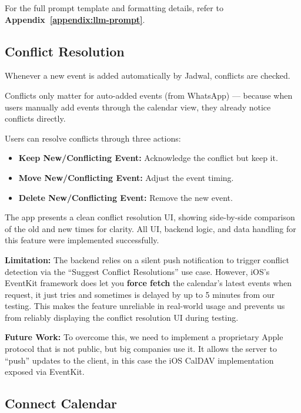For the full prompt template and formatting details, refer to \textbf{Appendix~\ref{appendix:llm-prompt}}.

\subsection{Conflict Resolution} \label{subsec:conflict-resolution}

Whenever a new event is added automatically by Jadwal, conflicts are checked.

Conflicts only matter for auto-added events (from WhatsApp) — because when users manually add events through the calendar view, they already notice conflicts directly.

Users can resolve conflicts through three actions:
\begin{itemize}
    \item \textbf{Keep New/Conflicting Event:} Acknowledge the conflict but keep it.
    \item \textbf{Move New/Conflicting Event:} Adjust the event timing.
    \item \textbf{Delete New/Conflicting Event:} Remove the new event.
\end{itemize}

The app presents a clean conflict resolution UI, showing side-by-side comparison of the old and new times for clarity. All UI, backend logic, and data handling for this feature were implemented successfully.

\textbf{Limitation:} The backend relies on a silent push notification to trigger conflict detection via the “Suggest Conflict Resolutions” use case. However, iOS's EventKit framework does let you \textbf{force fetch} the calendar's latest events when request, it just tries and sometimes is delayed by up to 5 minutes from our testing. This makes the feature unreliable in real-world usage and prevents us from reliably displaying the conflict resolution UI during testing.

\textbf{Future Work:} To overcome this, we need to implement a proprietary Apple protocol that is not public, but big companies use it. It allows the server to ``push'' updates to the client, in this case the iOS CalDAV implementation exposed via EventKit.

\subsection{Connect Calendar} \label{subsec:connect-calendar}

